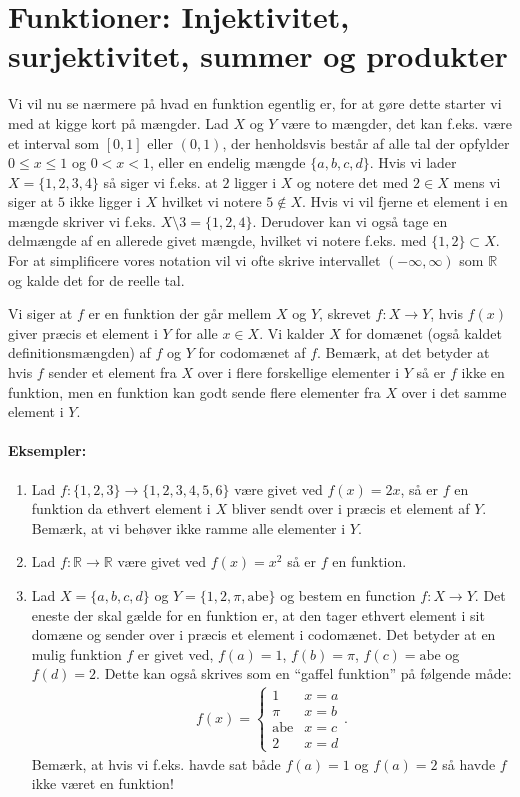 \section{Funktioner: Injektivitet, surjektivitet, summer og produkter}
Vi vil nu se nærmere på hvad en funktion egentlig er, for at gøre dette starter vi med at kigge kort på mængder. Lad $X$ og $Y$ være to mængder, det kan f.eks. være et interval som $[0,1]$ eller $(0,1)$, der henholdsvis består af alle tal der opfylder $0 \leq x \leq 1$ og $0 < x < 1$, eller en endelig mængde $\{a,b,c,d\}$. Hvis vi lader $X = \{1,2,3,4\}$ så siger vi f.eks. at $2$ ligger i $X$ og notere det med $2 \in X$ mens vi siger at $5$ ikke ligger i $X$ hvilket vi notere $5 \not\in X$. Hvis vi vil fjerne et element i en mængde skriver vi f.eks. $X \setminus 3 = \{1,2,4\}$. Derudover kan vi også tage en delmængde af en allerede givet mængde, hvilket vi notere f.eks. med $\{1,2\} \subset X$. For at simplificere vores notation vil vi ofte skrive intervallet $(-\infty,\infty)$ som $\mathbb{R}$ og kalde det for de reelle tal. 



Vi siger at $f$ er en funktion der går mellem $X$ og $Y$, skrevet $f \colon X \to Y$, hvis $f(x)$ giver præcis et element i $Y$ for alle $x \in X$. Vi kalder $X$ for domænet (også kaldet definitionsmængden) af $f$ og $Y$ for codomænet af $f$. Bemærk, at det betyder at hvis $f$ sender et element fra $X$ over i flere forskellige elementer i $Y$ så er $f$ ikke en funktion, men en funktion kan godt sende flere elementer fra $X$ over i det samme element i $Y$.

\paragraph*{Eksempler:}
\begin{enumerate}
\item Lad $f \colon \{1,2,3\} \to \{1,2,3,4,5,6\}$ være givet ved $f(x)=2x$, så er $f$ en funktion da ethvert element i $X$ bliver sendt over i præcis et element af $Y$. Bemærk, at vi behøver ikke ramme alle elementer i $Y$. 
\item Lad $f \colon \mathbb{R} \to \mathbb{R}$ være givet ved $f(x)=x^2$ så er $f$ en funktion.
\item Lad $X=\{a,b,c,d\}$ og $Y=\{1,2,\pi,\mathrm{abe}\}$ og bestem en function $f\colon X \to Y$. Det eneste der skal gælde for en funktion er, at den tager ethvert element i sit domæne og sender over i præcis et element i codomænet. Det  betyder at en mulig funktion $f$ er givet ved, $f(a)=1$, $f(b)=\pi$, $f(c)=\mathrm{abe}$  og $f(d)=2$. Dette kan også skrives som en ``gaffel funktion'' på følgende måde:
\begin{align*}
f (x) = \begin{cases} 
1 & x=a \\
\pi & x= b\\
\mathrm{abe} & x=c\\
2 & x=d
\end{cases}.
\end{align*}
Bemærk, at hvis vi f.eks. havde sat både $f(a)=1$ og $f(a)=2$ så havde $f$ ikke været en funktion!
\end{enumerate}

